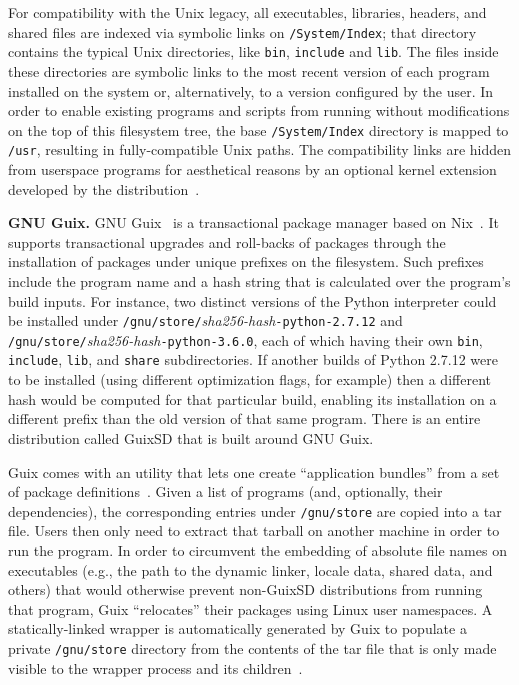 \documentclass[sigplan, anonymous, 10pt]{acmart}
\begin{document}
For compatibility with the Unix legacy, all executables, libraries, headers, and shared
files are indexed via symbolic links on \texttt{/System/Index};
that directory contains the typical Unix directories, like \texttt{bin}, \texttt{include}
and \texttt{lib}. The files inside these directories are symbolic links to the
most recent version of each program installed on the system or, alternatively, to a version
configured by the user. In order to enable existing programs and scripts from running
without modifications on the top of this filesystem tree, the base \texttt{/System/Index}
directory is mapped to \texttt{/usr}, resulting in fully-compatible Unix paths.
The compatibility links are hidden from userspace programs for aesthetical reasons
by an optional kernel extension developed by the distribution~\cite{damasio2003:gobohide}.

\textbf{GNU Guix.}
GNU Guix~\cite{courtes2013:guix} is a transactional package manager based on Nix~\cite{dolstra2004:nix}.
It supports transactional upgrades and
roll-backs of packages through the installation of packages under unique prefixes on the filesystem.
Such prefixes include the program name and a hash string that is calculated over the program's
build inputs. For instance, two distinct versions of the Python interpreter could be installed
under \texttt{/gnu/store/}\textit{sha256-hash}\texttt{-python-2.7.12} and \texttt{/gnu/store/}\textit{sha256-hash}\texttt{-python-3.6.0},
each of which having their own \texttt{bin}, \texttt{include}, \texttt{lib}, and \texttt{share}
subdirectories. If another builds of Python 2.7.12 were to be installed (using different optimization
flags, for example) then a different hash would be computed for that particular build, enabling its
installation on a different prefix than the old version of that same program. There is an entire
distribution called GuixSD that is built around GNU Guix.

Guix comes with an utility that lets one create ``application bundles'' from a set of package
definitions~\cite{gnu2017:bundles}. Given a list of programs (and, optionally, their dependencies),
the corresponding entries under \texttt{/gnu/store} are copied into a tar file. Users then only
need to extract that tarball on another machine in order to run the program. In order to circumvent
the embedding of absolute file names on executables (e.g., the path to the dynamic linker, locale
data, shared data, and others) that would otherwise prevent non-GuixSD distributions from running
that program, Guix ``relocates'' their packages using Linux user namespaces. A statically-linked
wrapper is automatically generated by Guix to populate a private \texttt{/gnu/store} directory
from the contents of the tar file that is only made visible to the wrapper process and its
children~\cite{gnu2018:tarballs}.
\end{document}
